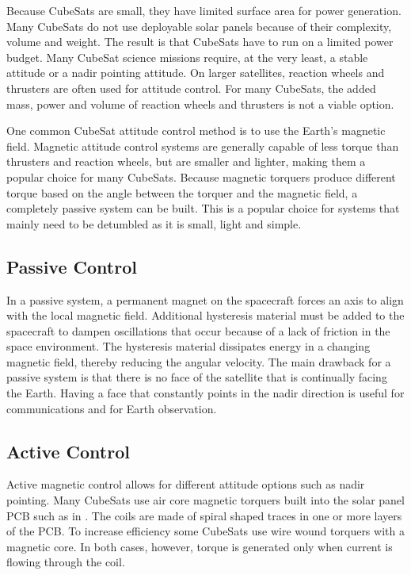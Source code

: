 Because CubeSats are small, they have limited surface area for power generation. Many CubeSats do not use deployable solar panels because of their complexity, volume and weight. The result is that CubeSats have to run on a limited power budget. Many CubeSat science missions require, at the very least, a stable attitude or a nadir pointing attitude. On larger satellites, reaction wheels and thrusters are often used for attitude control. For many CubeSats, the added mass, power and volume of reaction wheels and thrusters is not a viable option.

One common CubeSat attitude control method is to use the Earth's magnetic field. Magnetic attitude control systems are generally capable of less torque than thrusters and reaction wheels, but are smaller and lighter, making them a popular choice for many CubeSats. Because magnetic torquers produce different torque based on the angle between the torquer and the magnetic field, a completely passive system can be built. This is a popular choice for systems that mainly need to be detumbled as it is small, light and simple. 

\subsection{Passive Control}

In a passive system, a permanent magnet on the spacecraft forces an axis to align with the local magnetic field. Additional hysteresis material must be added to the spacecraft to dampen oscillations that occur because of a lack of friction in the space environment. The hysteresis material dissipates energy in a changing magnetic field, thereby reducing the angular velocity. The main drawback for a passive system is that there is no face of the satellite that is continually facing the Earth. Having a face that constantly points in the nadir direction is useful for communications and for Earth observation.

\subsection{Active Control}

Active magnetic control allows for different attitude options such as nadir pointing. Many CubeSats use air core magnetic torquers built into the solar panel \ac{PCB} such as in \cite{6511478,ClydePannel}. The coils are made of spiral shaped traces in one or more layers of the \ac{PCB}. To increase efficiency some CubeSats use wire wound torquers with a magnetic core. In both cases, however, torque is generated only when current is flowing through the coil. 

